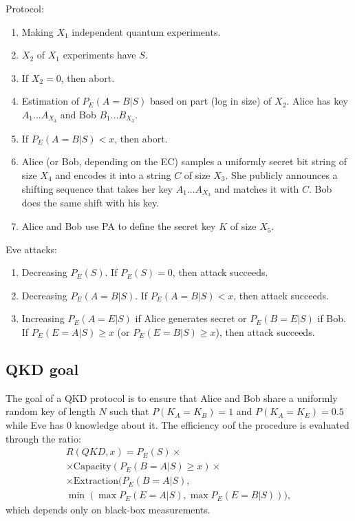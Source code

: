 \documentclass[a4paper,twocolumn,11pt,unpublished]{quantumarticle}
\begin{document}
Protocol:
\begin{enumerate}
    \item Making $X_1$ independent quantum experiments.
    \item $X_2$ of $X_1$ experiments have $S$.
    \item If $X_2 = 0$, then abort.
    \item Estimation of $P_E(A=B|S)$ based on part (log in size) of $X_2$.
    Alice has key $A_1 \ldots A_{X_3}$ and Bob $B_1 \ldots B_{X_3}$.
    \item If $P_E(A=B|S) < x$, then abort.
    \item Alice (or Bob, depending on the EC) samples a uniformly secret bit
    string of size $X_4$ and encodes it into a string $C$ of size $X_3$.
    She publicly announces a shifting sequence that takes her key
    $A_1 \ldots A_{X_3}$ and matches it with $C$. Bob does the same shift
    with his key.
    \item Alice and Bob use PA to define the secret key $K$ of size $X_5$.
\end{enumerate}

Eve attacks:
\begin{enumerate}
    \item Decreasing $P_E(S)$. If $P_E(S) = 0$, then attack succeeds.
    \item Decreasing $P_E(A=B|S)$. If $P_E(A=B|S) < x$, then attack succeeds.
    \item Increasing $P_E(A=E|S)$ if Alice generates secret or $P_E(B=E|S)$
    if Bob. If $P_E(E=A|S) \ge x$ (or $P_E(E=B|S) \ge x$), then attack
    succeeds.
\end{enumerate}

\subsection{QKD goal}
The goal of a QKD protocol is to ensure that Alice and Bob share a uniformly
random key of length $N$ such that $P(K_A=K_B)=1$ and $P(K_A=K_E)=0.5$ while Eve
has $0$ knowledge about it. The efficiency oof the procedure is evaluated
through the ratio:
\begin{equation}
    \begin{split}
        R(QKD, x) = P_E(S) \times \\
        \times \mathrm{Capacity}(P_E(B=A|S) \ge x) \times \\
        \times \mathrm{Extraction}(P_E(B=A|S), \\ 
        \min (\max P_E(E=A|S), \max P_E(E=B|S))),
    \end{split}
\end{equation}
which depends only on black-box measurements.
\end{document}

